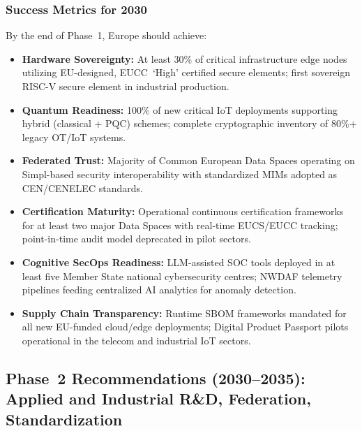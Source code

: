 \documentclass{ieeeaccess}
\begin{document}
\subsubsection*{Success Metrics for 2030}
By the end of Phase~1, Europe should achieve:
\begin{itemize}
    \item \textbf{Hardware Sovereignty:}
    At least 30\% of critical infrastructure edge nodes utilizing
    EU-designed, EUCC~`High' certified secure elements; first sovereign
    RISC-V secure element in industrial production.

    \item \textbf{Quantum Readiness:}
    100\% of new critical IoT deployments supporting hybrid (classical
    + PQC) schemes; complete cryptographic inventory of 80\%+ legacy
    OT/IoT systems.

    \item \textbf{Federated Trust:}
    Majority of Common European Data Spaces operating on Simpl-based
    security interoperability with standardized MIMs adopted as
    CEN/CENELEC standards.

    \item \textbf{Certification Maturity:}
    Operational continuous certification frameworks for at least two
    major Data Spaces with real-time EUCS/EUCC tracking; point-in-time
    audit model deprecated in pilot sectors.

    \item \textbf{Cognitive SecOps Readiness:}
    LLM-assisted SOC tools deployed in at least five Member State
    national cybersecurity centres; NWDAF telemetry pipelines feeding
    centralized AI analytics for anomaly detection.

    \item \textbf{Supply Chain Transparency:}
    Runtime SBOM frameworks mandated for all new EU-funded cloud/edge
    deployments; Digital Product Passport pilots operational in the
    telecom and industrial IoT sectors.
\end{itemize}

\subsection*{Phase~2 Recommendations (2030--2035):
             Applied and Industrial R\&D, Federation, Standardization}
\end{document}
